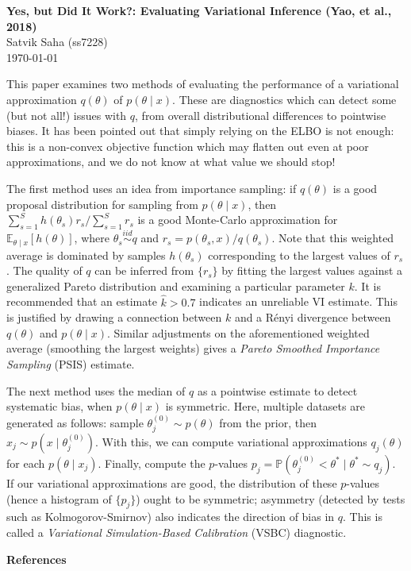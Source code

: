 \documentclass[12pt]{article}
\begin{document}
\begin{flushleft}
\textbf{Yes, but Did It Work?: Evaluating Variational Inference (Yao, et al., 2018)} \\
Satvik Saha (ss7228) \\
\today
\end{flushleft}

\vspace{0.1in}


This paper examines two methods of evaluating the performance of a variational
approximation $q(\theta)$ of $p(\theta\mid x)$.
These are diagnostics which can detect some (but not all!) issues with $q$,
from overall distributional differences to pointwise biases.
It has been pointed out that simply relying on the ELBO is not enough: this is
a non-convex objective function which may flatten out even at poor
approximations, and we do not know at what value we should stop!

The first method uses an idea from importance sampling: if $q(\theta)$ is a
good proposal distribution for sampling from $p(\theta\mid x)$, then $\sum_{s =
1}^S h(\theta_s) r_s/\sum_{s = 1}^S r_s$ is a good Monte-Carlo approximation
for $\mathbb{E}_{\theta\mid x}[h(\theta)]$, where $\theta_s \overset{iid}{\sim}
q$ and $r_s = p(\theta_s, x) / q(\theta_s)$.
Note that this weighted average is dominated by samples $h(\theta_s)$
corresponding to the largest values of $r_s$.
The quality of $q$ can be inferred from $\{r_s\}$ by fitting the largest values
against a generalized Pareto distribution and examining a particular parameter
$k$.
It is recommended that an estimate $\hat{k} > 0.7$ indicates an unreliable VI
estimate.
This is justified by drawing a connection between $k$ and a R\'enyi divergence
between $q(\theta)$ and $p(\theta\mid x)$.
Similar adjustments on the aforementioned weighted average (smoothing the
largest weights) gives a \emph{Pareto Smoothed Importance Sampling} (PSIS)
estimate.

The next method uses the median of $q$ as a pointwise estimate to detect
systematic bias, when $p(\theta\mid x)$ is symmetric.
Here, multiple datasets are generated as follows: sample $\theta^{(0)}_j \sim
p(\theta)$ from the prior, then $x_j \sim p(x\mid \theta^{(0)}_j)$.
With this, we can compute variational approximations $q_j(\theta)$ for each
$p(\theta\mid x_j)$.
Finally, compute the $p$-values $p_j = \mathbb{P}(\theta^{(0)}_j < \theta^*
\mid \theta^* \sim q_j)$.
If our variational approximations are good, the distribution of these
$p$-values (hence a histogram of $\{p_j\}$) ought to be symmetric; asymmetry
(detected by tests such as Kolmogorov-Smirnov) also indicates the direction of
bias in $q$.
This is called a \emph{Variational Simulation-Based Calibration} (VSBC)
diagnostic.





\nocite{*}


\vfill

\begingroup
\renewcommand{\section}[2]{}%
\textbf{References}

\endgroup
\end{document}
